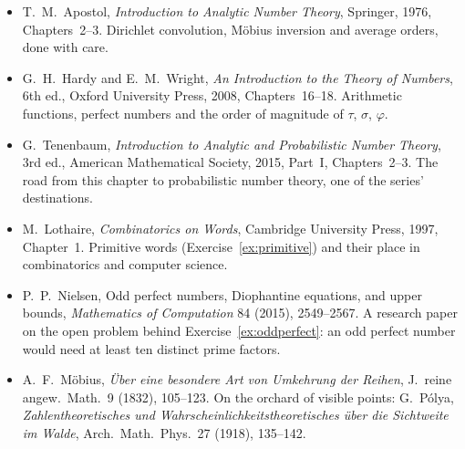 \begin{itemize}
\item T.~M.~Apostol, \emph{Introduction to Analytic Number Theory}, Springer, 1976, Chapters~2--3. Dirichlet convolution, M\"obius inversion and average orders, done with care.
\item G.~H.~Hardy and E.~M.~Wright, \emph{An Introduction to the Theory of Numbers}, 6th ed., Oxford University Press, 2008, Chapters~16--18. Arithmetic functions, perfect numbers and the order of magnitude of $\tau$, $\sigma$, $\varphi$.
\item G.~Tenenbaum, \emph{Introduction to Analytic and Probabilistic Number Theory}, 3rd ed., American Mathematical Society, 2015, Part~I, Chapters~2--3. The road from this chapter to probabilistic number theory, one of the series' destinations.
\item M.~Lothaire, \emph{Combinatorics on Words}, Cambridge University Press, 1997, Chapter~1. Primitive words (Exercise~\ref{ex:primitive}) and their place in combinatorics and computer science.
\item P.~P.~Nielsen, Odd perfect numbers, Diophantine equations, and upper bounds, \emph{Mathematics of Computation} 84 (2015), 2549--2567. A research paper on the open problem behind Exercise~\ref{ex:oddperfect}: an odd perfect number would need at least ten distinct prime factors.
\item A.~F.~M\"obius, \emph{\"Uber eine besondere Art von Umkehrung der Reihen}, J.\ reine angew.\ Math.\ 9 (1832), 105--123. On the orchard of visible points: G.~P\'olya, \emph{Zahlentheoretisches und Wahrscheinlichkeitstheoretisches \"uber die Sichtweite im Walde}, Arch.\ Math.\ Phys.\ 27 (1918), 135--142.
\end{itemize}
